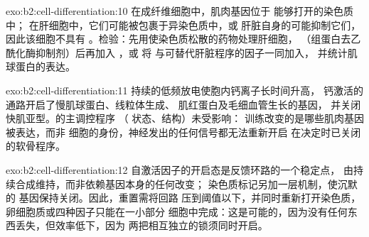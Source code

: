 \begin{solution}{exo:b2:cell-differentiation:10}
在成纤维细胞中，肌肉基因位于  能够打开的染色质中；
在肝细胞中，它们可能被包裹于异染色质中，或
肝脏自身的可能抑制它们，因此该细胞不具有
。检验：先用使染色质松散的药物处理肝细胞，
（组蛋白去乙酰化酶抑制剂）后再加入 ，或
将  与可替代肝脏程序的因子一同加入，
并统计肌球蛋白的表达。
\end{solution}

\begin{solution}{exo:b2:cell-differentiation:11}
持续的低频放电使胞内钙离子长时间升高，
钙激活的通路开启了慢肌球蛋白、线粒体生成、
肌红蛋白及毛细血管生长的基因，
并关闭快肌亚型。的主调控程序
（ 状态、结构）未受影响：
训练改变的是哪些肌肉基因被表达，而非
细胞的身份，神经发出的任何信号都无法重新开启
在决定时已关闭的软骨程序。
\end{solution}

\begin{solution}{exo:b2:cell-differentiation:12}
自激活因子的开启态是反馈环路的一个稳定点，
由持续合成维持，而非依赖基因本身的任何改变；
染色质标记另加一层机制，使沉默的
基因保持关闭。因此，重置需将回路
压到阈值以下，并同时重新打开染色质，
卵细胞质或四种因子只能在一小部分
细胞中完成：这是可能的，因为没有任何东西丢失，但效率低下，因为
两把相互独立的锁须同时开启。
\end{solution}

